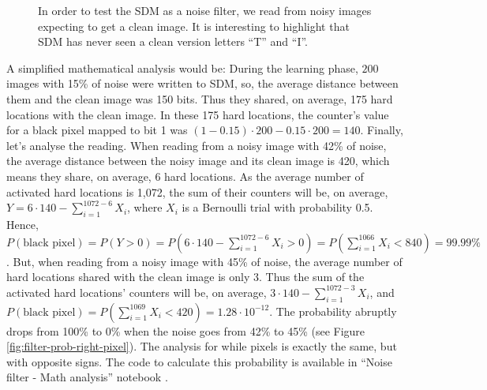\begin{figure}[!htb]


  \caption{In order to test the SDM as a noise filter, we read from noisy images expecting to get a clean image. It is interesting to highlight that SDM has never seen a clean version letters ``T'' and ``I''.
  \label{fig:filter-testing}
  }
\end{figure}

A simplified mathematical analysis would be: During the learning phase, $200$ images with 15\% of noise were written to SDM, so, the average distance between them and the clean image was 150 bits. Thus they shared, on average, 175 hard locations with the clean image. In these 175 hard locations, the counter's value for a black pixel mapped to bit 1 was $(1-0.15) \cdot 200 - 0.15 \cdot 200 = 140$. Finally, let's analyse the reading. When reading from a noisy image with 42\% of noise, the average distance between the noisy image and its clean image is 420, which means they share, on average, 6 hard locations. As the average number of activated hard locations is 1,072, the sum of their counters will be, on average, $Y = 6 \cdot 140 - \sum_{i=1}^{1072-6} X_i$, where $X_i$ is a Bernoulli trial with probability 0.5. Hence, $P(\text{black pixel}) = P(Y > 0) = P(6 \cdot 140 - \sum_{i=1}^{1072-6} X_i > 0) = P(\sum_{i=1}^{1066} X_i < 840) = 99.99\%$. But, when reading from a noisy image with 45\% of noise, the average number of hard locations shared with the clean image is only 3. Thus the sum of the activated hard locations' counters will be, on average, $3 \cdot 140 - \sum_{i=1}^{1072-3} X_i$, and $P(\text{black pixel}) = P(\sum_{i=1}^{1069} X_i < 420) = 1.28 \cdot 10^{-12}$. The probability abruptly drops from 100\% to 0\% when the noise goes from 42\% to 45\% (see Figure \ref{fig:filter-prob-right-pixel}). The analysis for while pixels is exactly the same, but with opposite signs. The code to calculate this probability is available in ``Noise filter - Math analysis'' notebook \citep{sdmframework}.

